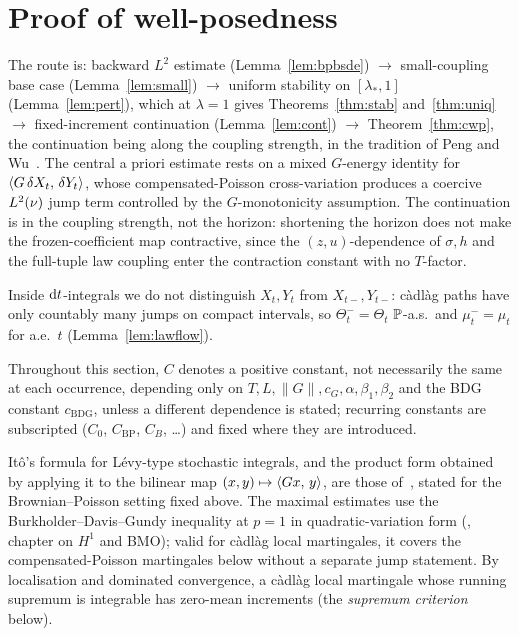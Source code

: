 \section{Proof of well-posedness}
\label{sec:wp-proof}

The route is: backward $L^2$ estimate
(Lemma~\ref{lem:bpbsde}) $\to$ small-coupling base case (Lemma~\ref{lem:small}) $\to$
uniform stability on $[\lambda_*,1]$ (Lemma~\ref{lem:pert}), which at $\lambda=1$ gives
Theorems~\ref{thm:stab} and~\ref{thm:uniq} $\to$ fixed-increment continuation
(Lemma~\ref{lem:cont}) $\to$ Theorem~\ref{thm:cwp}, the continuation being along the
coupling strength, in the tradition of Peng and Wu~\cite{PengWu}. The central a priori
estimate rests on a mixed $G$-energy identity for $\langle G\,\delta X_t,\,\delta Y_t\rangle$,
whose compensated-Poisson cross-variation produces a coercive $L^2(\nu)$ jump term controlled
by the $G$-monotonicity assumption. The continuation is in the coupling strength, not the
horizon: shortening the horizon does not make the frozen-coefficient map contractive,
since the $(z,u)$-dependence of $\sigma,h$ and the full-tuple law coupling enter the
contraction constant with no $T$-factor.

Inside $\mathrm{d} t$-integrals we do not distinguish $X_t,Y_t$ from $X_{t-},Y_{t-}$:
c\`adl\`ag paths have only countably many jumps on compact intervals, so
$\Theta_t^-=\Theta_t$ $\mathbb{P}$-a.s.\ and $\mu_t^-=\mu_t$ for a.e.\ $t$
(Lemma~\ref{lem:lawflow}).

Throughout this section, $C$ denotes a positive constant, not necessarily the same at each
occurrence, depending only on $T,L,\|G\|,c_G,\alpha,\beta_1,\beta_2$ and the BDG constant
$c_{\mathrm{BDG}}$, unless a different dependence is stated; recurring constants are
subscripted ($C_0$, $C_{\mathrm{BP}}$, $C_B$, \dots) and fixed where they are introduced.

It\^o's formula for L\'evy-type stochastic integrals, and the product form obtained by
applying it to the bilinear map $(x,y)\mapsto\langle Gx,\,y\rangle$, are those
of~\cite[\S4.4]{Applebaum}, stated for the Brownian--Poisson setting fixed above. The
maximal estimates use the Burkholder--Davis--Gundy inequality at $p=1$ in
quadratic-variation form (\cite{HeWangYan}, chapter on $H^1$ and BMO); valid for
c\`adl\`ag local martingales, it covers the compensated-Poisson martingales below without
a separate jump statement. By localisation and dominated convergence, a c\`adl\`ag local
martingale whose running supremum is integrable has zero-mean increments (the
\emph{supremum criterion} below).

